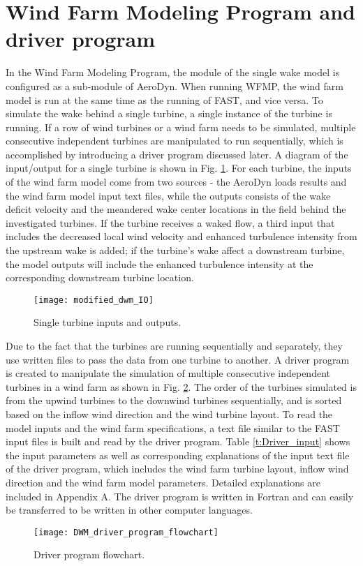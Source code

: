 \documentclass{umthesis}
\begin{document}
\section{Wind Farm Modeling Program and driver program}\label{sec:DWM_FAST}
In the Wind Farm Modeling Program, the module of the single wake model is configured as a sub-module of AeroDyn. When running WFMP, the wind farm model is run at the same time as the running of FAST, and vice versa. To simulate the wake behind a single turbine, a single instance of the turbine is running. If a row of wind turbines or a wind farm needs to be simulated, multiple consecutive independent turbines are manipulated to run sequentially, which is accomplished by introducing a driver program discussed later. A diagram of the input/output for a single turbine is shown in Fig. \ref{fig:DWM_IO}. For each turbine, the inputs of the wind farm model come from two sources - the AeroDyn loads results and the wind farm model input text files, while the outputs consists of the wake deficit velocity and the meandered wake center locations in the field behind the investigated turbines. If the turbine receives a waked flow, a third input that includes the decreased local wind velocity and enhanced turbulence intensity from the upstream wake is added; if the turbine's wake affect a downstream turbine, the model outputs will include the enhanced turbulence intensity at the corresponding downstream turbine location.
\begin{figure}
  \centering
  \texttt{[image: modified\_dwm\_IO]}
  \caption{Single turbine inputs and outputs.}\label{fig:DWM_IO}
\end{figure}

Due to the fact that the turbines are running sequentially and separately, they use written files to pass the data from one turbine to another. A driver program is created to manipulate the simulation of multiple consecutive independent turbines in a wind farm as shown in Fig. \ref{fig:driver program flowchart}. The order of the turbines simulated is from the upwind turbines to the downwind turbines sequentially, and is sorted based on the inflow wind direction and the wind turbine layout. To read the model inputs and the wind farm specifications, a text file similar to the FAST input files is built and read by the driver program. Table \ref{t:Driver_input} shows the input parameters as well as corresponding explanations of the input text file of the driver program, which includes the wind farm turbine layout, inflow wind direction and the wind farm model parameters. Detailed explanations are included in Appendix A. The driver program is written in Fortran and can easily be transferred to be written in other computer languages.
\begin{figure}
  \centering
  \texttt{[image: DWM\_driver\_program\_flowchart]}
  \caption{Driver program flowchart.}\label{fig:driver program flowchart}
\end{figure}
\end{document}
